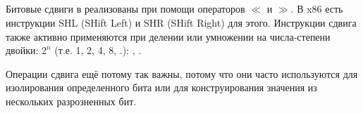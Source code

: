 \subsection{\ShiftsSectionName}

Битовые сдвиги в \CCpp реализованы при помощи операторов $\ll$ и $\gg$.
В x86 есть инструкции SHL (SHift Left) и SHR (SHift Right) для этого.
Инструкции сдвига также активно применяются при делении или умножении на числа-степени двойки: $2^{n}$ (т.е. 1, 2, 4, 8, \etc{}.):
,
.


Операции сдвига ещё потому так важны, потому что они часто используются для изолирования
определенного бита или для конструирования значения из нескольких разрозненных бит.

